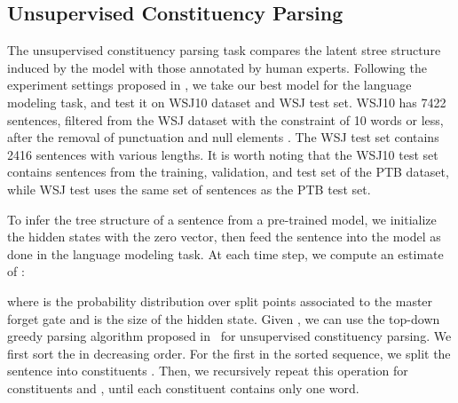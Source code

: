 \documentclass{article} \usepackage{iclr2019_conference,times}
\begin{document}
\subsection{Unsupervised Constituency Parsing}
The unsupervised constituency parsing task compares the latent stree structure induced by the model with those annotated by human experts.
Following the experiment settings proposed in \citet{htut2018grammar}, we take our best model for the language modeling task, and test it on WSJ10 dataset and WSJ test set.
WSJ10 has 7422 sentences, filtered from the WSJ dataset with the constraint of 10 words or less, after the removal of punctuation and null elements \citep{klein2002generative}.
The WSJ test set contains 2416 sentences with various lengths.
It is worth noting that the WSJ10 test set contains sentences from the training, validation, and test set of the PTB dataset, while WSJ test uses the same set of sentences as the PTB test set.

To infer the tree structure of a sentence from a pre-trained model, we initialize the hidden states with the zero vector, then feed the sentence into the model as done in the language modeling task. At each time step, we compute an estimate of :

where  is the probability distribution over split points associated to the master forget gate and  is the size of the hidden state. Given , we can use the top-down greedy parsing algorithm proposed in~\citet{shen2017neural} for unsupervised constituency parsing. We first sort the  in decreasing order. For the first  in the sorted sequence, we split the sentence into constituents . Then, we recursively repeat this operation for constituents  and , until each constituent contains only one word.
\end{document}
